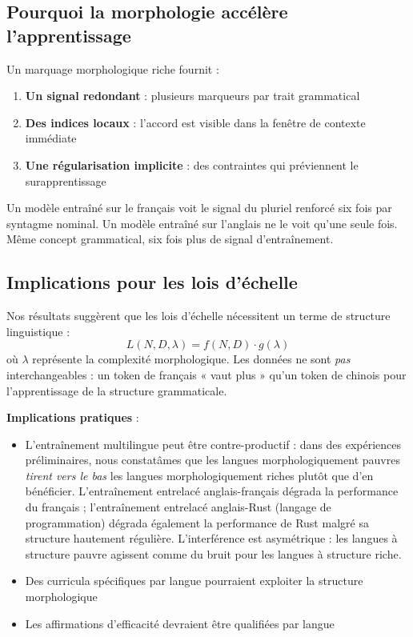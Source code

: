 \documentclass[11pt]{article}
\begin{document}
\subsection{Pourquoi la morphologie accélère l'apprentissage}

Un marquage morphologique riche fournit :
\begin{enumerate}
    \item \textbf{Un signal redondant} : plusieurs marqueurs par trait grammatical
    \item \textbf{Des indices locaux} : l'accord est visible dans la fenêtre de contexte immédiate
    \item \textbf{Une régularisation implicite} : des contraintes qui préviennent le surapprentissage
\end{enumerate}

Un modèle entraîné sur le français voit le signal du pluriel renforcé six fois par syntagme nominal. Un modèle entraîné sur l'anglais ne le voit qu'une seule fois. Même concept grammatical, six fois plus de signal d'entraînement.

\subsection{Implications pour les lois d'échelle}

Nos résultats suggèrent que les lois d'échelle nécessitent un terme de structure linguistique :
\[
L(N, D, \lambda) = f(N, D) \cdot g(\lambda)
\]
où $\lambda$ représente la complexité morphologique. Les données ne sont \textit{pas} interchangeables : un token de français « vaut plus » qu'un token de chinois pour l'apprentissage de la structure grammaticale.

\textbf{Implications pratiques} :
\begin{itemize}
    \item L'entraînement multilingue peut être contre-productif : dans des expériences préliminaires, nous constatâmes que les langues morphologiquement pauvres \textit{tirent vers le bas} les langues morphologiquement riches plutôt que d'en bénéficier. L'entraînement entrelacé anglais-français dégrada la performance du français ; l'entraînement entrelacé anglais-Rust (langage de programmation) dégrada également la performance de Rust malgré sa structure hautement régulière. L'interférence est asymétrique : les langues à structure pauvre agissent comme du bruit pour les langues à structure riche.
    \item Des curricula spécifiques par langue pourraient exploiter la structure morphologique
    \item Les affirmations d'efficacité devraient être qualifiées par langue
\end{itemize}
\end{document}
